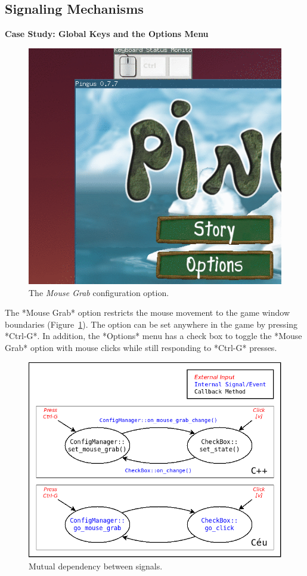\documentclass{vgtc}                          %
\begin{document}
\subsection{Signaling Mechanisms}

\textbf{Case Study: Global Keys and the Options Menu}

\begin{figure}[t]
\centering
\includegraphics[width=\columnwidth]{options-anim-opt}
\caption{The \emph{Mouse Grab} configuration option.
\label{fig.options}
}
\end{figure}

The *Mouse Grab* option restricts the mouse movement to the game window
boundaries (Figure~\ref{fig.options}).
The option can be set anywhere in the game by pressing *Ctrl-G*.
In addition, the *Options* menu has a check box to toggle the *Mouse Grab*
option with mouse clicks while still responding to *Ctrl-G* presses.

\begin{figure}[t]
\centering
\includegraphics[width=\columnwidth]{events}
\caption{Mutual dependency between signals.
\label{fig.events}
}
\end{figure}
\end{document}
